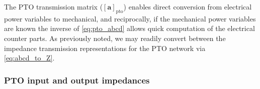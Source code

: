 \documentclass[lettersize,journal]{IEEEtran}
\begin{document}

%
The PTO transmission matrix ($\left[ \mathbf{a} \right]_{\textrm{pto}}$) enables direct conversion from electrical power variables to mechanical, and reciprocally, if the mechanical power variables are known the inverse of \eqref{eq:pto_abcd} allows quick computation of the electrical counter parts.
As previously noted, we may readily convert between the impedance transmission representations for the PTO network via \eqref{eq:abcd_to_Z}.

\subsubsection{PTO input and output impedances}\label{sec:pto_input_and_output_impedances}
\end{document}
